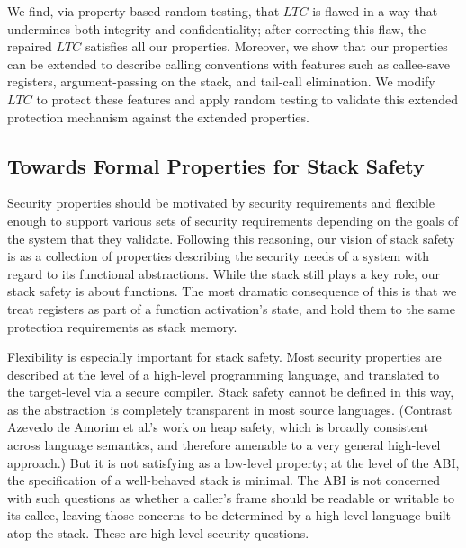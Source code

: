 \documentclass[10pt,conference]{ieeetran}%
\theoremstyle{definition}
\begin{document}
We find, via property-based random testing, that \(LTC\) is flawed in
a way that undermines both integrity and confidentiality; after
correcting this flaw, the repaired \(LTC\) satisfies all our
properties.  Moreover, we show that our properties can be extended to
describe calling conventions with features such as callee-save
registers, argument-passing on the stack, and tail-call
elimination. We modify \(LTC\) to protect these features and apply
random testing to validate this extended protection mechanism against
the extended properties.

\subsection {Towards Formal Properties for Stack Safety}


Security properties should be motivated by security requirements
and flexible enough to support various sets of security requirements depending on the
goals of the system that they validate.
Following this reasoning, our vision of stack safety is as a collection of properties
describing the security needs of a system with regard to its functional abstractions.
While the stack still plays a key role, our stack safety is about functions. The most
dramatic consequence of this is that we treat registers as part of a function activation's
state, and hold them to the same protection requirements as stack memory.

Flexibility is especially important for stack safety.
%
Most security properties are described at the level of a high-level programming language,
and translated to the target-level via a secure compiler. Stack safety cannot
be defined in this way, as the abstraction is completely transparent in most source languages.
(Contrast Azevedo de Amorim et al.'s \cite{DBLP:conf/post/AmorimHP18} work on heap safety,
which is broadly consistent across language semantics, and therefore
amenable to a very general high-level approach.)
%
But it is not satisfying as a low-level property; at the level of the ABI, the
specification of a well-behaved stack is minimal. The ABI is not concerned with such
questions as whether a caller's frame should be readable or writable to its callee,
leaving those concerns to be determined by a high-level language built atop the stack.
These are high-level security questions.
\end{document}
